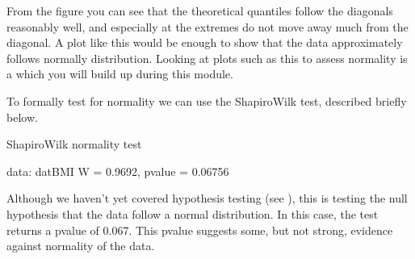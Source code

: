 \documentclass[letterpaper,10pt,english]{jupyterBook}
\begin{document}
\begin{sphinxVerbatim}[commandchars=\\\{\}]
  
  \PYG{p}{[}\PYG{p}{]}
 
   
\end{sphinxVerbatim}

\noindent{}

\sphinxAtStartPar
From the figure you can see that the theoretical quantiles follow the diagonals reasonably well, and especially at the extremes do not move away much from the diagonal. A plot like this would be enough to show that the data approximately follows normally distribution. Looking at plots such as this to assess normality is a  which you will build up during this module.

\sphinxAtStartPar
To formally test for normality we can use the Shapiro\sphinxhyphen{}Wilk test, described briefly below.

\begin{sphinxVerbatim}[commandchars=\\\{\}]
\end{sphinxVerbatim}

\begin{sphinxVerbatim}[commandchars=\\\{\}]
	Shapiro\PYGZhy{}Wilk normality test

data:  dat\PYGZdl{}BMI
W = 0.9692, p\PYGZhy{}value = 0.06756
\end{sphinxVerbatim}

\sphinxAtStartPar
Although we haven’t yet covered hypothesis testing (see ), this is testing the null hypothesis that the data follow a normal distribution. In this case, the test returns a p\sphinxhyphen{}value of 0.067. This p\sphinxhyphen{}value suggests some, but not strong, evidence against normality of the data.
\end{document}
